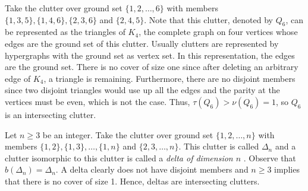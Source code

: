 \documentclass[a4paper, 12pt]{scrbook}
\theoremstyle{definition}
\begin{document}
Take the clutter over ground set $\{1,2,\ldots,6\}$ with members $\{1,3,5\}, \{1,4,6\}, \{2,3,6\}$ and $\{2,4,5\}$.
Note that this clutter, denoted by $Q_6$\cite{q6}, can be represented as the triangles of $K_4$, the complete graph on four vertices whose edges are the ground set of this clutter. Usually clutters are represented by hypergraphs with the ground set as vertex set. In this representation, the edges are the ground set.
There is no cover of size one since after deleting an arbitrary edge of $K_4$, a triangle is remaining.
Furthermore, there are no disjoint members since two disjoint triangles would use up all the edges and the parity at the vertices must be even, which is not the case.
Thus, $\tau(Q_6) > \nu(Q_6) = 1$, so $Q_6$ is an intersecting clutter.

    \begin{figure}[b]
        \centering
        \begin{minipage}{.4\textwidth}
            \centering
        \end{minipage}
        \begin{minipage}{.4\textwidth}
            \centering
        \end{minipage}
    \end{figure}


Let $n \geq 3$ be an integer.
Take the clutter over ground set $\{1,2,\ldots,n\}$ with members $\{1,2\},\{1,3\},\ldots,\{1,n\}$ and $\{2,3,\ldots,n\}$.
This clutter is called $\Delta_n$ and a clutter isomorphic to this clutter is called a \emph{delta of dimension $n$} \cite{deltadefinition}.
Observe that $b(\Delta_n)=\Delta_n$.
A delta clearly does not have disjoint members and $n\geq 3$ implies that there is no cover of size 1.
Hence, deltas are intersecting clutters.
\end{document}
